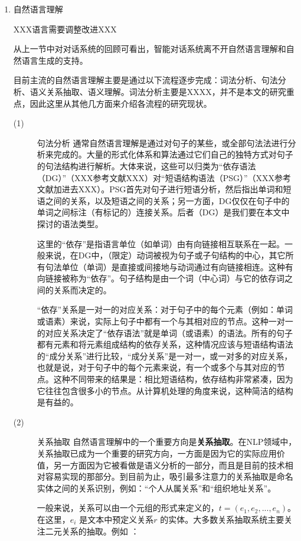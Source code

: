 \begin{enumerate}

\item{自然语言理解}

XXX语言需要调整改进XXX 

从上一节中对对话系统的回顾可看出，智能对话系统离不开自然语言理解和自然语言生成的支持。

目前主流的自然语言理解主要是通过以下流程逐步完成：词法分析、句法分析、语义关系抽取、语义理解。词法分析主要是XXXX，并不是本文的研究重点，因此这里从其他几方面来介绍各流程的研究现状。


\begin{description}
\item[(1)]{句法分析}
通常自然语言理解是通过对句子的某些，或全部句法法进行分析来完成的。大量的形式化体系和算法通过它们自己的独特方式对句子的句法结构进行解析。大体来说，这些可以归类为“依存语法（DG）”（XXX参考文献XXX）对“短语结构语法（PSG）”（XXX参考文献加进去XXX）。PSG首先对句子进行短语分析，然后指出单词和短语之间的关系，以及短语之间的关系；另一方面，DG仅仅在句子中的单词之间标注（有标记的）连接关系。后者（DG）是我们要在本文中探讨的语法类型。


这里的“依存”是指语言单位（如单词）由有向链接相互联系在一起。一般来说，在DG中，（限定）动词被视为句子或子句结构的中心，其它所有句法单位（单词）是直接或间接地与动词通过有向链接相连。这种有向链接被称为“依存”。句子结构是由一个词（中心词）与它的依存词之间的关系而决定的。


“依存”关系是一对一的对应关系：对于句子中的每个元素（例如：单词或语素）来说，实际上句子中都有一个与其相对应的节点。这种一对一的对应关系决定了“依存语法”就是单词（或语素）的语法。所有的句子都有元素和将元素组成结构的依存关系，这种情况应该与短语结构语法的“成分关系”进行比较，“成分关系”是一对一，或一对多的对应关系，也就是说，对于句子中的每个元素来说，有一个或多个与其对应的节点。这种不同带来的结果是：相比短语结构，依存结构非常紧凑，因为它往往包含很多小的节点。从计算机处理的角度来说，这种简洁的结构是有益的。


\item[(2)]{关系抽取}
自然语言理解中的一个重要方向是{\bf 关系抽取}。在NLP领域中，关系抽取已成为一个重要的研究方向，一方面是因为它的实际应用价值，另一方面因为它被看做是语义分析的一部分，而且是目前的技术相对容易实现的那部分。到目前为止，吸引最多注意力的关系抽取是命名实体之间的关系识别，例如：“个人从属关系”和“组织地址关系”。

一般来说，关系可以由一个元组的形式来定义的，$t = (e_1, e_2, ...,e_n)$。在这里，$e_i$ 是文本中预定义关系$r$ 的实体。大多数关系抽取系统主要关注二元关系的抽取。例如 ：


\end{description}
\end{enumerate}
